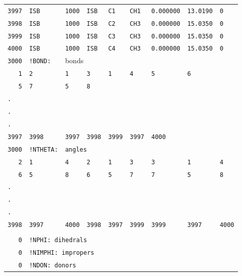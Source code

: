 {\begin{tabular}{r l l l l l l l l}
\texttt{3997} & \texttt{ISB} & \texttt{1000} & \texttt{ISB} & \texttt{C1} & \texttt{CH1} & \texttt{0.000000} & \texttt{13.0190} & \texttt{0}\\
\texttt{3998} & \texttt{ISB} & \texttt{1000} & \texttt{ISB} & \texttt{C2} & \texttt{CH3} & \texttt{0.000000} & \texttt{15.0350} & \texttt{0}\\
\texttt{3999} & \texttt{ISB} & \texttt{1000} & \texttt{ISB} & \texttt{C3} & \texttt{CH3} & \texttt{0.000000} & \texttt{15.0350} & \texttt{0}\\
\texttt{4000} & \texttt{ISB} & \texttt{1000} & \texttt{ISB} & \texttt{C4} & \texttt{CH3} & \texttt{0.000000} & \texttt{15.0350} & \texttt{0}\\
\texttt{3000} & \texttt{!BOND:} & \multicolumn{7}{l}{bonds}\\
\texttt{1} & \texttt{2} & \texttt{1} & \texttt{3} & \texttt{1} & \texttt{4} & \texttt{5} & \multicolumn{2}{l}{\texttt{6}}\\ 
\texttt{5} & \texttt{7} & \texttt{5} & \multicolumn{2}{l}{\texttt{8}}\\ 
\multicolumn{9}{l}{\texttt{.}}\\
\multicolumn{9}{l}{\texttt{.}}\\
\multicolumn{9}{l}{\texttt{.}}\\
\texttt{3997} & \texttt{3998} & \texttt{3997} & \texttt{3998} & \texttt{3999} & \texttt{3997} & \multicolumn{3}{l}{\texttt{4000}}\\
\texttt{3000} & \texttt{!NTHETA:} & \multicolumn{7}{l}{\texttt{angles}}\\
\texttt{2} & \texttt{1} & \texttt{4} & \texttt{2} & \texttt{1} & \texttt{3} & \texttt{3} & \texttt{1} & \texttt{4}\\
\texttt{6} & \texttt{5} & \texttt{8} & \texttt{6} & \texttt{5} & \texttt{7} & \texttt{7} & \texttt{5} & \texttt{8}\\
\multicolumn{9}{l}{\texttt{.}}\\
\multicolumn{9}{l}{\texttt{.}}\\
\multicolumn{9}{l}{\texttt{.}}\\
\texttt{3998} & \texttt{3997} & \texttt{4000} & \texttt{3998} & \texttt{3997} & \texttt{3999} & \texttt{3999} & \texttt{3997} & \texttt{4000}\\\\
\texttt{0} & \multicolumn{8}{l}{\texttt{!NPHI: dihedrals}}\\
\texttt{0} & \multicolumn{8}{l}{\texttt{!NIMPHI: impropers}}\\
\texttt{0} & \multicolumn{8}{l}{\texttt{!NDON: donors}}\\

\end{tabular}}

